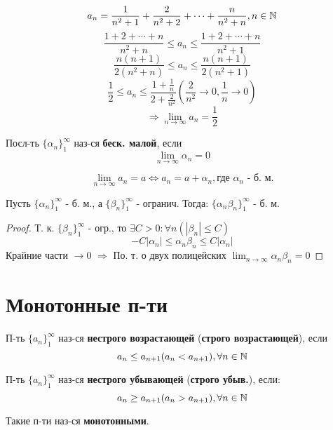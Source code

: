 \begin{example}
\[
  a_n = \frac{1}{n^{2} + 1} + \frac{2}{n^{2} + 2} +\cdots + \frac{n}{n^{2} + n}, n \in \mathbb{N}
\] 
\[
  \frac{1 + 2 + \cdots + n}{n^{2} + n} \leq a_n \leq \frac{1 + 2 + \cdots + n}{n^{2} + 1}
\] 
\[
  \frac{n(n + 1)}{2(n^{2} + n)} \leq a_n \leq \frac{n(n + 1)}{2(n^{2} + 1)}
\] 
\[
  \frac{1}{2} \leq a_n \leq \frac{1 + \frac{1}{n}}{2 + \frac{2}{n^{2}}} (\frac{2}{n^{2}} \rightarrow 0, \frac{1}{n} \rightarrow 0)
\] 
\[
\Rightarrow \lim_{n\to\infty}a_n = \frac{1}{2}
\] 
\end{example}

\begin{definition}
Посл-ть $\{\alpha_n\}_{1}^{\infty}$ наз-ся \textbf{беск. малой}, если
\[
  \lim_{n\to\infty}\alpha_n = 0
\]
\end{definition}
\begin{note}
\[
\lim_{n\to\infty}a_n = a \iff a_n = a + \alpha_n, \text{где $\alpha_n$ - б. м.}
\]
\end{note}
\begin{example}
Пусть $\{\alpha_n\}_{1}^{\infty}$ - б. м., а $\{\beta_n\}_{1}^{\infty}$ - огранич. Тогда: $\{\alpha_n \beta_n\}_{1}^{\infty}$ - б. м.
\end{example}
\begin{proof}
Т. к. $\{\beta_n\}_{1}^{\infty}$ - огр., то $\exists C > 0 \colon \forall n (|\beta_n| \leq C)$
\[
-C |\alpha_n| \leq \alpha_n \beta_n \leq C |\alpha_n|
\] 
Крайние части $\rightarrow 0$ $\Rightarrow$ По. т. о двух полицейских $\lim_{n\to\infty} \alpha_n \beta_n = 0$
\end{proof}

\section{Монотонные п-ти}

\begin{definition}
П-ть $\{a_n\}_{1}^{\infty}$ наз-ся \textbf{нестрого возрастающей} (\textbf{строго возрастающей}), если \[
a_n \leq a_{n + 1} (a_n < a_{n + 1}), \forall n \in \mathbb{N}
\] 

П-ть $\{a_n\}_{1}^{\infty}$ наз-ся \textbf{нестрого убывающей} (\textbf{строго убыв.}), если:
\[
a_n \geq a_{n + 1} (a_n > a_{n + 1}), \forall n \in \mathbb{N}
\] 

Такие п-ти наз-ся \textbf{монотонными}.
\end{definition}

